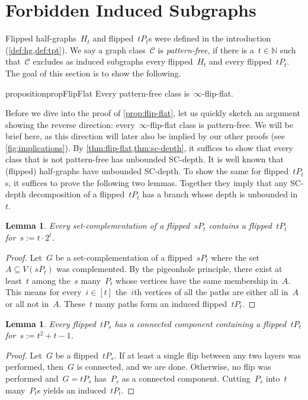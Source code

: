 \documentclass[11pt]{article}      \usepackage[margin=1in]{geometry}  \usepackage{microtype}
\newtheorem{lemma}[theorem]{Lemma}
\theoremstyle{definition}
\newcommand{\N}[0]{\mathrm{\mathbb{N}}}
\newcommand{\CC}{\mathcal{C}}
\begin{document}
 
\section{Forbidden Induced Subgraphs}\label{sec:subgraphs}

Flipped half-graphs~$H_t$ and flipped~$tP_t$s were defined in the introduction (\cref{def:hg,def:tpt}).
We say a graph class~$\CC$ is \emph{pattern-free}, if there is a~$t\in \N$ such that~$\CC$ excludes as induced subgraphs every flipped~$H_t$ and
every flipped~$tP_t$.
The goal of this section is to show the following.

\begin{restatable}{proposition}{propFlipFlat}
  \label{prop:flip-flat}
  Every pattern-free class is~$\infty$-flip-flat.
\end{restatable}

Before we dive into the proof of \cref{prop:flip-flat}, let us quickly sketch an argument showing the reverse direction: every~$\infty$-flip-flat class is pattern-free.
We will be brief here, as this direction will later also be implied by our other proofs (see \cref{fig:implications}).
By \cref{thm:flip-flat,thm:sc-depth}, it suffices to show that every class that is not pattern-free has unbounded SC-depth.
It is well known that (flipped) half-graphs have unbounded SC-depth.
To show the same for flipped~$tP_t$s,
it suffices to prove the following two lemmas. Together they imply that any SC-depth decomposition of a flipped~$tP_t$ has a branch whose depth is unbounded in~$t$.

\begin{lemma}
  Every set-complementation of a flipped~$sP_t$ contains a flipped~$tP_t$ for~$s := t \cdot 2^t$.
\end{lemma}
\begin{proof}
  Let~$G$ be a set-complementation of a flipped~$sP_t$ where the set~$A \subseteq V(sP_t)$ was complemented.
  By the pigeonhole principle, there exist at least~$t$ among the~$s$ many~$P_t$ whose vertices have the same membership in~$A$. This means for every~$i \in [t]$  the~$i$th vertices of all the paths are either all in~$A$ or all not in~$A$.
  These~$t$ many paths form an induced flipped~$tP_t$.
\end{proof}

\begin{lemma}
  Every flipped~$tP_s$ has a connected component containing a flipped~$tP_t$ for~$s := t^2 + t - 1$.
\end{lemma}
\begin{proof}
  Let~$G$ be a flipped~$tP_s$.
  If at least a single flip between any two layers was performed, then~$G$ is connected, and we are done.
  Otherwise, no flip was performed and~$G = tP_s$ has~$P_s$ as a connected component.
  Cutting~$P_s$ into~$t$ many~$P_t$s yields an induced~$tP_t$.
\end{proof}
\end{document}
